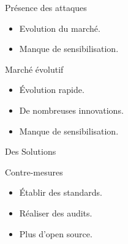 \begin{frame}{Présence des attaques}%
    \begin{itemize}
        \item Evolution du marché.
        \item Manque de sensibilisation.
    \end{itemize}
    \begin{block}{Marché évolutif}
        \begin{itemize}
            \item Évolution rapide.
            \item De nombreuses innovations.
            \item Manque de sensibilisation.
        \end{itemize}
    \end{block}
\end{frame}

\begin{frame}{Des Solutions}
    \begin{block}{Contre-mesures}
        \begin{itemize}
            \item Établir des standards. 
            \item Réaliser des audits.
            \item Plus d'open source.
        \end{itemize}
    \end{block}
\end{frame}